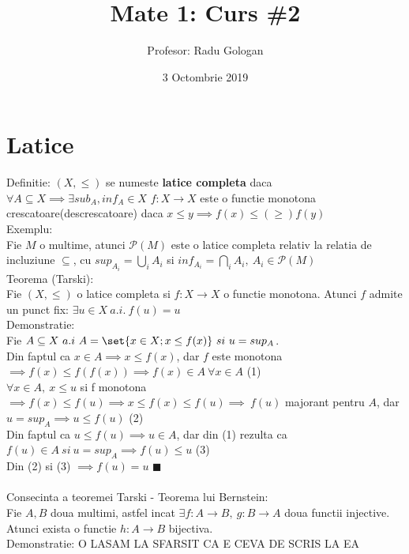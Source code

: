 \documentclass{article}
\title{Mate 1: Curs \#2}
\author{Profesor: Radu Gologan}
\date{3 Octombrie 2019}
\newcommand*{\QEDA}{\hfill\ensuremath{\blacksquare}}%
\begin{document}
    
    \maketitle
    \section{Latice}
        Definitie: $(X,\leq)$ se numeste \textbf{latice completa} daca $\forall A \subseteq X\implies \exists sub_A,inf_A\in X$
        $f:X\rightarrow X$ este o functie monotona crescatoare(descrescatoare) daca $x\leq y \implies f(x)\leq(\geq)f(y)$\\
        Exemplu:\\
        Fie $M$ o multime, atunci $\mathscr{P}(M)$ este o latice completa relativ la relatia de incluziune $\subseteq$, cu $sup_{A_i} =
        \displaystyle{\bigcup_{i}} A_i$ si $inf_{A_i}=\displaystyle{\bigcap_{i}}A_i,\ A_i\in \mathscr{P}(M)$\\
        Teorema (Tarski):\\
        Fie $(X,\leq)$ o latice completa si $f:X\rightarrow X$ o functie monotona. Atunci $f$ admite un punct fix: $\exists u \in X\ a.i.\ f(u)=u$\\
        Demonstratie:\\
        Fie $A\subseteq X\ a.i\ A=\set{x\in X;x\leq f(x)}\ si\ u = sup_A$.\\ 
        Din faptul ca $x\in A \implies x\leq f(x)$, dar $f$ este monotona $\implies f(x)\leq f(f(x)) \implies f(x) \in A\ \forall x\in
        A$ \hfill (1)\\
        $\forall x\in A,\ x\leq u$ si f monotona $\implies f(x) \leq f(u)\implies x\leq f(x)\leq f(u)\implies\ f(u)$ majorant pentru $A$, dar $u=sup_A\implies u
        \leq f(u)$ \hfill (2)\\
        Din faptul ca $u\leq f(u) \implies u\in A$, dar din (1) rezulta ca $f(u)\in A\ si\ u=sup_A \implies f(u)\leq u$ \hfill (3)\\
        Din (2) si (3) $\implies f(u)=u$ \hfill \QEDA\\ \\
        Consecinta a teoremei Tarski - Teorema lui Bernstein:\\
        Fie $A,B$ doua multimi, astfel incat $\exists f:A\rightarrow B,\ g:B\rightarrow A$ doua functii injective. Atunci exista o functie $h:A\rightarrow B$
        bijectiva.\\
        Demonstratie:
        O LASAM LA SFARSIT CA E CEVA DE SCRIS LA EA\\ \\
        
\end{document}
